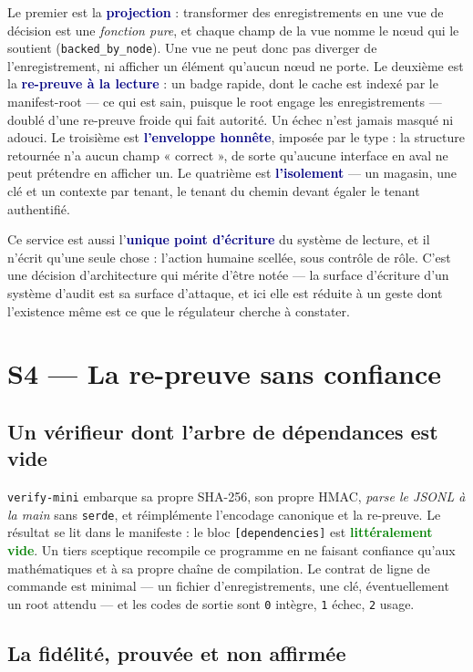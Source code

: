 \documentclass[10pt]{article}
\newcommand{\code}[1]{\texttt{\small #1}}
\newcommand{\mm}[1]{\textbf{\textcolor{navy}{#1}}}
\newcommand{\ok}[1]{\textcolor{green}{\textbf{#1}}}
\begin{document}
Le premier est la \mm{projection} : transformer des enregistrements en une vue de décision est une \emph{fonction pure}, et chaque champ de la vue nomme le nœud qui le soutient (\code{backed\_by\_node}). Une vue ne peut donc pas diverger de l'enregistrement, ni afficher un élément qu'aucun nœud ne porte. Le deuxième est la \mm{re-preuve à la lecture} : un badge rapide, dont le cache est indexé par le manifest-root — ce qui est sain, puisque le root engage les enregistrements — doublé d'une re-preuve froide qui fait autorité. Un échec n'est jamais masqué ni adouci. Le troisième est \mm{l'enveloppe honnête}, imposée par le type : la structure retournée n'a aucun champ « correct », de sorte qu'aucune interface en aval ne peut prétendre en afficher un. Le quatrième est \mm{l'isolement} — un magasin, une clé et un contexte par tenant, le tenant du chemin devant égaler le tenant authentifié.

Ce service est aussi l'\mm{unique point d'écriture} du système de lecture, et il n'écrit qu'une seule chose : l'action humaine scellée, sous contrôle de rôle. C'est une décision d'architecture qui mérite d'être notée — la surface d'écriture d'un système d'audit est sa surface d'attaque, et ici elle est réduite à un geste dont l'existence même est ce que le régulateur cherche à constater.

\section{S4 — La re-preuve sans confiance}

\subsection{Un vérifieur dont l'arbre de dépendances est vide}

\code{verify-mini} embarque sa propre SHA-256, son propre HMAC, \emph{parse le JSONL à la main} sans \code{serde}, et réimplémente l'encodage canonique et la re-preuve. Le résultat se lit dans le manifeste : le bloc \code{[dependencies]} est \ok{littéralement vide}. Un tiers sceptique recompile ce programme en ne faisant confiance qu'aux mathématiques et à sa propre chaîne de compilation. Le contrat de ligne de commande est minimal — un fichier d'enregistrements, une clé, éventuellement un root attendu — et les codes de sortie sont \code{0} intègre, \code{1} échec, \code{2} usage.

\subsection{La fidélité, prouvée et non affirmée}
\end{document}
